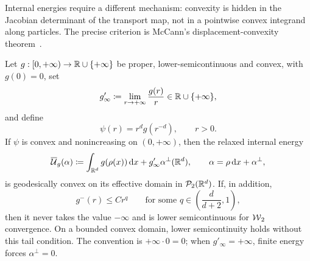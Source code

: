 Internal energies require a different mechanism: convexity is hidden in the Jacobian determinant of the transport map, not in a pointwise convex integrand along particles. The precise criterion is McCann's displacement-convexity theorem~\cite{mccann1997convexity}.

\begin{thm}\label{thm-mccann-internal-energy}
	Let \(g:[0,+\infty)\to\mathbb{R}\cup\{+\infty\}\) be proper, lower-semicontinuous and convex, with \(g(0)=0\), set
	\[
		g'_\infty\coloneqq\lim_{r\to+\infty}\frac{g(r)}r\in\mathbb{R}\cup\{+\infty\},
	\]
	and define
	\[
		\psi(r)=r^d g(r^{-d}),\qquad r>0.
	\]
	If \(\psi\) is convex and nonincreasing on \((0,+\infty)\), then the relaxed internal energy
	\[
		\overline{\mathcal U}_g(\alpha)
		\coloneqq
		\int_{\mathbb{R}^d}g(\rho(x))\,\mathrm{d} x
		+g'_\infty\alpha^\perp(\mathbb{R}^d),
		\qquad
		\alpha=\rho\,\mathrm{d} x+\alpha^\perp,
	\]
	is geodesically convex on its effective domain in \(\mathcal{P}_2(\mathbb{R}^d)\). If, in addition,
	\[
		g^-(r)\leq C r^q
		\qquad\text{for some }q\in\left(\frac{d}{d+2},1\right),
	\]
	then it never takes the value \(-\infty\) and is lower semicontinuous for \(\operatorname{\mathcal{W}}_2\) convergence. On a bounded convex domain, lower semicontinuity holds without this tail condition. The convention is \(+\infty\cdot0=0\); when \(g'_\infty=+\infty\), finite energy forces \(\alpha^\perp=0\).
\end{thm}
